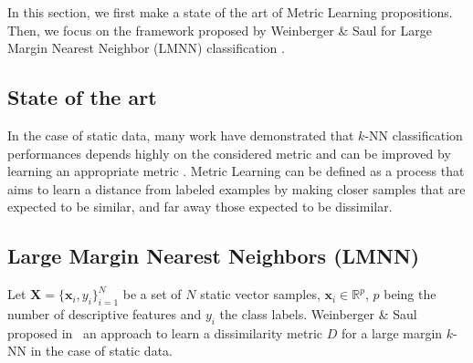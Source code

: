 In this section, we first make a state of the art of Metric Learning propositions. Then, we focus on the framework proposed by Weinberger \& Saul for Large Margin Nearest Neighbor (LMNN) classification \cite{Weinberger2009}.

\subsection{State of the art}
In the case of static data, many work have demonstrated that $k$-NN classification performances depends highly on the considered metric and can be improved by learning an appropriate metric \cite{Shental2002,Goldberger2004,Chopra2005}. Metric Learning can be defined as a process that aims to learn a distance from labeled examples by making closer samples that are expected to be similar, and far away those expected to be dissimilar.

%


\subsection{Large Margin Nearest Neighbors (LMNN)}
Let $\textbf{X}=\{\textbf{x}_i,y_i\}_{i=1}^N$ be a set of $N$ static vector samples, ${\textbf{x}_i \in \mathbb{R}^{p}}$, $p$ being the number of descriptive features and $y_i$ the class labels. Weinberger \& Saul proposed in~\cite{Weinberger2009} an approach to learn a dissimilarity metric $D$ for a large margin $k$-NN in the case of static data. 

